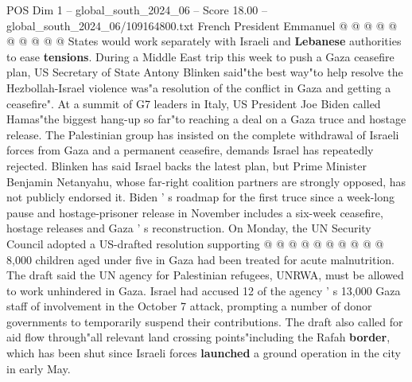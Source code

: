 \begin{textsample}{POS Dim 1 – global\_south\_2024\_06 – Score 18.00 – global\_south\_2024\_06/109164800.txt}
French President Emmanuel @ @ @ @ @ @ @ @ @ @ States would work separately with Israeli and \textbf{Lebanese} authorities to ease \textbf{tensions}.
During a Middle East trip this week to push a Gaza ceasefire plan, US Secretary of State Antony Blinken said"the best way"to help resolve the Hezbollah-Israel violence was"a resolution of the conflict in Gaza and getting a ceasefire".
At a summit of G7 leaders in Italy, US President Joe Biden called Hamas"the biggest hang-up so far"to reaching a deal on a Gaza truce and hostage release.
The Palestinian group has insisted on the complete withdrawal of Israeli forces from Gaza and a permanent ceasefire, demands Israel has repeatedly rejected.
Blinken has said Israel backs the latest plan, but Prime Minister Benjamin Netanyahu, whose far-right coalition partners are strongly opposed, has not publicly endorsed it.
Biden ' s roadmap for the first truce since a week-long pause and hostage-prisoner release in November includes a six-week ceasefire, hostage releases and Gaza ' s reconstruction.
On Monday, the UN Security Council adopted a US-drafted resolution supporting @ @ @ @ @ @ @ @ @ @ 8,000 children aged under five in Gaza had been treated for acute malnutrition.
The draft said the UN agency for Palestinian refugees, UNRWA, must be allowed to work unhindered in Gaza.
Israel had accused 12 of the agency ' s 13,000 Gaza staff of involvement in the October 7 attack, prompting a number of donor governments to temporarily suspend their contributions.
The draft also called for aid flow through"all relevant land crossing points"including the Rafah \textbf{border}, which has been shut since Israeli forces \textbf{launched} a ground operation in the city in early May.

\end{textsample}

